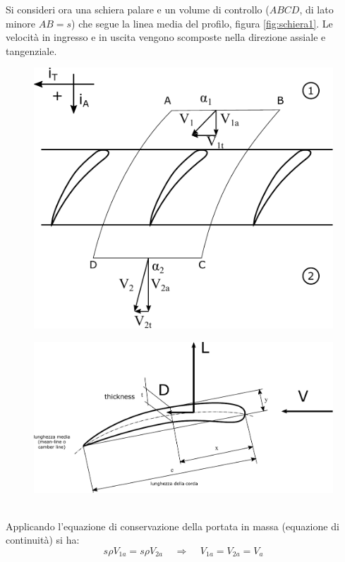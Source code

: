 Si consideri ora una schiera palare e un volume di controllo ($ABCD$, di lato minore $AB=s$) che segue la linea media del profilo, figura \ref{fig:schiera1}. Le velocità in ingresso e in uscita vengono scomposte nella direzione assiale e tangenziale. 
\begin{figure}
\centering
\begin{minipage}{.4\textwidth}
  \centering
  \includegraphics[width=.95\linewidth]{fig/schiera1.pdf}
  \label{fig:schiera1}
\end{minipage}%
\begin{minipage}{.6\textwidth}
  \centering
  \includegraphics[width=.85\linewidth]{fig/LDref.pdf}
  \label{fig:LDref}
\end{minipage}
\end{figure}
\\Applicando l'equazione di conservazione della portata in massa (equazione di continuità) si ha:
\begin{equation}
s \rho V_{1a} = s \rho V_{2a} \;\;\;\; \Rightarrow \;\;\;\; V_{1a} = V_{2a} = V_a
\end{equation}
